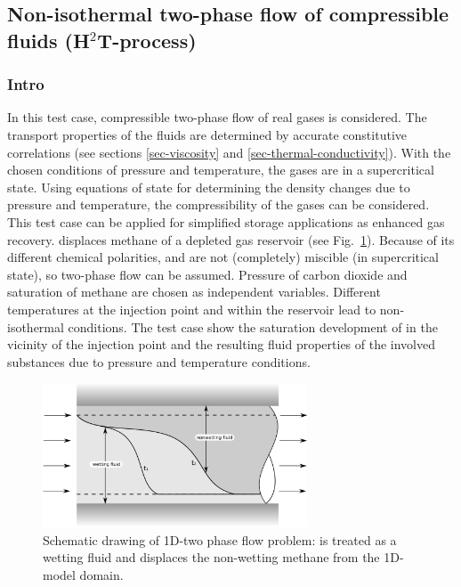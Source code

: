 \subsection[Non-isothermal two-phase flow]{Non-isothermal two-phase flow of compressible fluids (H$^2$T-process)}

\subsubsection*{Intro}

In this test case, compressible two-phase flow of real gases is considered. The transport properties of the fluids are determined by accurate constitutive correlations (see sections \ref{sec-viscosity} and \ref{sec-thermal-conductivity}). With the chosen conditions of pressure and temperature, the gases are in a supercritical state. Using equations of state for determining the density changes due to pressure and temperature, the compressibility of the gases can be considered. This test case can be applied for simplified {} storage applications as enhanced gas recovery. {} displaces methane of a depleted gas reservoir (see Fig.~\ref{fig_egr_scheme}). Because of its different chemical polarities, {} and {} are not (completely) miscible (in supercritical state), so two-phase flow can be assumed. Pressure of carbon dioxide and saturation of methane are chosen as independent variables. Different temperatures at the injection point and within the reservoir lead to non-isothermal conditions. The test case show the saturation development of {} in the vicinity of the injection point and the resulting fluid properties of the involved substances due to pressure and temperature conditions. 

 \begin{figure}[h]
\centering
\includegraphics[width=0.7\textwidth]{FLUID_PROPERTIES/figures/egr-scheme.eps}
\captionsetup{format=hang,justification=raggedright,justification=justified}
\caption{Schematic drawing of 1D-two phase flow problem: {} is treated as a wetting fluid and displaces the non-wetting methane from the 1D-model domain.}
\label{fig_egr_scheme}
\end{figure}


